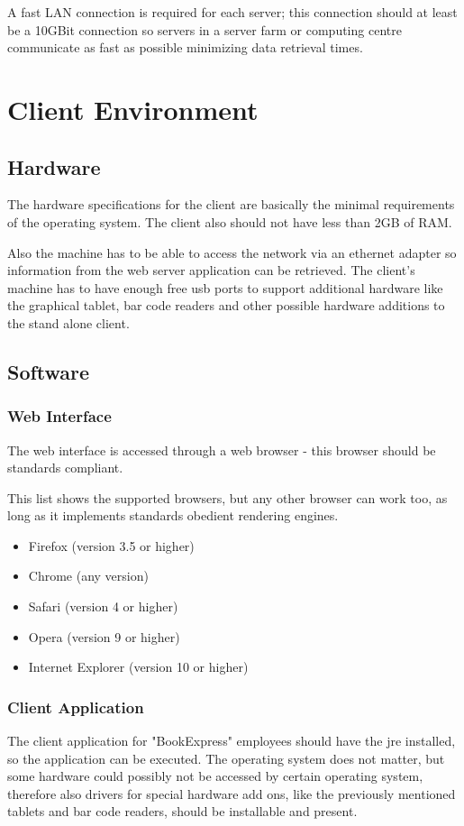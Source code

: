 \documentclass[11pt,a4paper,oneside,svgnames]{report}
\begin{document}
A fast LAN connection is required for each server; this connection should at least be a 10GBit connection so servers in a server farm or computing centre communicate as fast as possible minimizing data retrieval times.

\section{Client Environment}
\subsection{Hardware}
The hardware specifications for the client are basically the minimal requirements of the operating system. The client also should not have less than 2GB of RAM.

Also the machine has to be able to access the network via an ethernet adapter so information from the web server application can be retrieved. The client's machine has to have enough free usb ports to support additional hardware like the graphical tablet, bar code readers and other possible hardware additions to the stand alone client.
\subsection{Software}
\subsubsection{Web Interface}
The web interface is accessed through a web browser - this browser should be standards compliant.

This list shows the supported browsers, but any other browser can work too, as long as it implements standards obedient rendering engines.

\begin{itemize}
	\item Firefox (version 3.5 or higher)
	\item Chrome (any version)
	\item Safari (version 4 or higher)
	\item Opera (version 9 or higher)
	\item Internet Explorer (version 10 or higher)
\end{itemize}
\subsubsection{Client Application}
The client application for "BookExpress" employees should have the \gls{jre} installed, so the application can be executed. The operating system does not matter, but some hardware could possibly not be accessed by certain operating system, therefore also drivers for special hardware add ons, like the previously mentioned tablets and bar code readers, should be installable and present.
\end{document}
